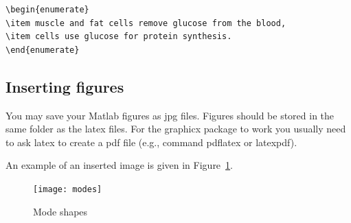 \documentclass[11pt]{book}
\begin{document}
\begin{verbatim}
\begin{enumerate}
\item muscle and fat cells remove glucose from the blood,
\item cells use glucose for protein synthesis.
\end{enumerate}
\end{verbatim}



\newpage



\subsection{Inserting figures}


You may save your Matlab figures as jpg files.  Figures should  be stored in the 
same folder as the latex files.
For the graphicx package to work you usually need to ask latex to create a pdf file (e.g., command pdflatex or latexpdf).

An example of an inserted image is given in Figure~\ref{fig:modes}.

\begin{center}
\begin{figure}[h]
		\centering
		\texttt{[image: modes]}
		\caption{Mode shapes}
		\label{fig:modes}
\end{figure}
\end{center}




 
\end{document}
